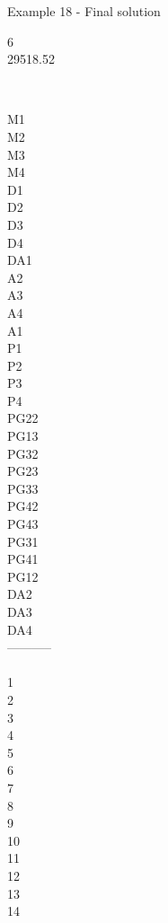 \begin{frame}{Example 18 - Final solution}

 6 \\
  29518.52\\

\begin{columns}[t]
\begin{column}{0.3\textwidth}
\\
M1\\
M2\\
M3\\
M4\\
D1\\
D2\\
D3\\
D4\\
DA1\\
A2\\
A3\\
A4\\
A1\\
P1\\
P2\\
P3\\
P4\\
PG22\\
PG13\\
PG32\\
PG23\\
PG33\\
PG42\\
PG43\\
PG31\\
PG41\\
PG12\\
DA2\\
DA3\\
DA4\\
-----------\\
\\
1\\
2\\
3\\
4\\
5\\
6\\
7\\
8\\
9\\
10\\
11\\
12\\
13\\
14\\

\end{column}
\end{columns}
\end{frame}
